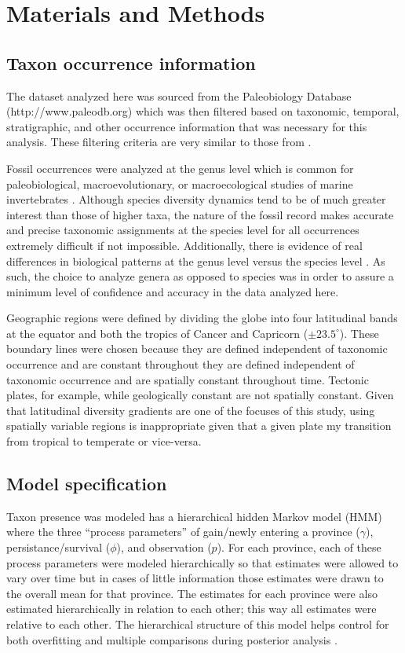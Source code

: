 \documentclass[12pt,letterpaper]{article}
\begin{document}
\section{Materials and Methods}
\subsection{Taxon occurrence information}
The dataset analyzed here was sourced from the Paleobiology Database (http://www.paleodb.org) which was then filtered based on taxonomic, temporal, stratigraphic, and other occurrence information that was necessary for this analysis. These filtering criteria are very similar to those from \citet{Foote2013}.

Fossil occurrences were analyzed at the genus level which is common for paleobiological, macroevolutionary, or macroecological studies of marine invertebrates \citep{Alroy2010,Foote2013,Harnik2013,Kiessling2007a,Miller2009a,Nurnberg2013a,Nurnberg2015,Payne2007,Simpson2009,Vilhena2013}. Although species diversity dynamics tend to be of much greater interest than those of higher taxa, the nature of the fossil record makes accurate and precise taxonomic assignments at the species level for all occurrences extremely difficult if not impossible. Additionally, there is evidence of real differences in biological patterns at the genus level versus the species level \citep{Jablonski1987}. As such, the choice to analyze genera as opposed to species was in order to assure a minimum level of confidence and accuracy in the data analyzed here.

Geographic regions were defined by dividing the globe into four latitudinal bands at the equator and both the tropics of Cancer and Capricorn (\(\pm 23.5^\circ\)). These boundary lines were chosen because they are defined independent of taxonomic occurrence and are constant throughout they are defined independent of taxonomic occurrence and are spatially constant throughout time. Tectonic plates, for example, while geologically constant are not spatially constant. Given that latitudinal diversity gradients are one of the focuses of this study, using spatially variable regions is inappropriate given that a given plate my transition from tropical to temperate or vice-versa.


\subsection{Model specification}
Taxon presence was modeled has a hierarchical hidden Markov model (HMM) where the three ``process parameters'' of gain/newly entering a province (\(\gamma\)), persistance/survival (\(\phi\)), and observation (\(p\)). For each province, each of these process parameters were modeled hierarchically so that estimates were allowed to vary over time but in cases of little information those estimates were drawn to the overall mean for that province. The estimates for each province were also estimated hierarchically in relation to each other; this way all estimates were relative to each other. The hierarchical structure of this model helps control for both overfitting and multiple comparisons during posterior analysis \citep{Gelman2007,Gelman2013d}. 
\end{document}
